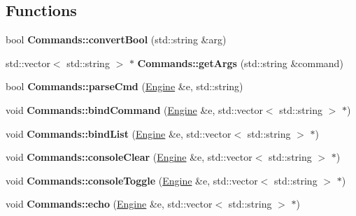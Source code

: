 \subsection*{Functions}
\begin{DoxyCompactItemize}
\item 
bool {\bfseries Commands\+::convert\+Bool} (std\+::string \&arg)\hypertarget{Commands_8hh_abefc016d0d849fec28bcec9eb5c5b106}{}\label{Commands_8hh_abefc016d0d849fec28bcec9eb5c5b106}

\item 
std\+::vector$<$ std\+::string $>$ $\ast$ {\bfseries Commands\+::get\+Args} (std\+::string \&command)\hypertarget{Commands_8hh_aa0b47ec166c1143d0dd20c51b301e6af}{}\label{Commands_8hh_aa0b47ec166c1143d0dd20c51b301e6af}

\item 
bool {\bfseries Commands\+::parse\+Cmd} (\hyperlink{classEngine}{Engine} \&e, std\+::string)\hypertarget{Commands_8hh_a37f1ccb092695e87da41e0625b240bee}{}\label{Commands_8hh_a37f1ccb092695e87da41e0625b240bee}

\item 
void {\bfseries Commands\+::bind\+Command} (\hyperlink{classEngine}{Engine} \&e, std\+::vector$<$ std\+::string $>$ $\ast$)\hypertarget{Commands_8hh_ac98ddc07caa88b780eac831a7763db02}{}\label{Commands_8hh_ac98ddc07caa88b780eac831a7763db02}

\item 
void {\bfseries Commands\+::bind\+List} (\hyperlink{classEngine}{Engine} \&e, std\+::vector$<$ std\+::string $>$ $\ast$)\hypertarget{Commands_8hh_a6b9cff92e05b8ee3bbdf2183bcab0405}{}\label{Commands_8hh_a6b9cff92e05b8ee3bbdf2183bcab0405}

\item 
void {\bfseries Commands\+::console\+Clear} (\hyperlink{classEngine}{Engine} \&e, std\+::vector$<$ std\+::string $>$ $\ast$)\hypertarget{Commands_8hh_a1edaf40648864f95d6fabd821fa1ff69}{}\label{Commands_8hh_a1edaf40648864f95d6fabd821fa1ff69}

\item 
void {\bfseries Commands\+::console\+Toggle} (\hyperlink{classEngine}{Engine} \&e, std\+::vector$<$ std\+::string $>$ $\ast$)\hypertarget{Commands_8hh_a5ccaf75c545b581e6f56960a63789cc9}{}\label{Commands_8hh_a5ccaf75c545b581e6f56960a63789cc9}

\item 
void {\bfseries Commands\+::echo} (\hyperlink{classEngine}{Engine} \&e, std\+::vector$<$ std\+::string $>$ $\ast$)\hypertarget{Commands_8hh_acf0412f16ea578d5fa8a56804db65edf}{}\label{Commands_8hh_acf0412f16ea578d5fa8a56804db65edf}


\end{DoxyCompactItemize}
